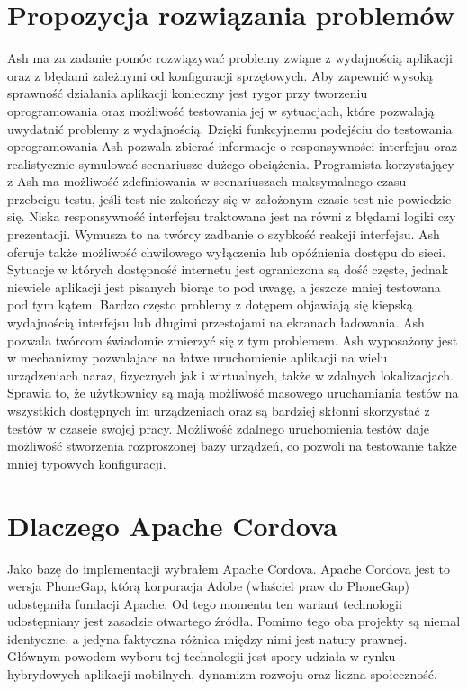 \documentclass[brudnopis]{xmgr}
\begin{document}
\section{Propozycja rozwiązania problemów}
Ash ma za zadanie pomóc rozwiązywać problemy zwiąne z wydajnością aplikacji oraz z
błędami zależnymi od konfiguracji sprzętowych. Aby
zapewnić wysoką sprawność działania aplikacji konieczny jest rygor przy tworzeniu
oprogramowania oraz możliwość testowania jej w sytuacjach, które pozwalają
uwydatnić problemy z wydajnością. Dzięki funkcyjnemu podejściu do testowania
oprogramowania Ash pozwala zbierać informacje o responsywności interfejsu
oraz realistycznie symulować scenariusze dużego obciążenia. Programista
korzystający z Ash ma możliwość zdefiniowania w scenariuszach maksymalnego
czasu przebeigu testu, jeśli test nie zakończy się w założonym czasie test nie
powiedzie się. Niska responsywność interfejsu traktowana jest na równi z błędami
logiki czy prezentacji. Wymusza to na twórcy zadbanie o szybkość reakcji interfejsu.
Ash oferuje także możliwość chwilowego wyłączenia lub opóźnienia dostępu do
sieci. Sytuacje w których dostępność internetu jest ograniczona są dość częste,
jednak niewiele aplikacji jest pisanych biorąc to pod uwagę, a jeszcze mniej 
testowana pod tym kątem. Bardzo często problemy z dotępem objawiają się kiepską
wydajnością interfejsu lub długimi przestojami na ekranach ładowania. Ash pozwala
twórcom świadomie zmierzyć się z tym problemem. Ash wyposażony jest w
mechanizmy pozwalajace na łatwe uruchomienie aplikacji na wielu urządzeniach
naraz, fizycznych jak i wirtualnych, także w zdalnych lokalizacjach. Sprawia to, że
użytkownicy są mają możliwość masowego uruchamiania testów na wszystkich
dostępnych im urządzeniach oraz są bardziej skłonni skorzystać z testów w czaseie
swojej pracy. Możliwość zdalnego uruchomienia testów daje możliwość stworzenia
rozproszonej bazy urządzeń, co pozwoli na testowanie także mniej typowych
konfiguracji.

\section{Dlaczego Apache Cordova}
Jako bazę do implementacji wybrałem Apache Cordova. Apache Cordova jest to
wersja PhoneGap, którą korporacja Adobe (właściel praw do PhoneGap) udostępniła
fundacji Apache. Od tego momentu ten wariant technologii udostępniany jest
zasadzie otwartego źródła. Pomimo tego oba projekty są niemal identyczne, a jedyna faktyczna różnica między nimi jest natury prawnej. Głównym powodem
wyboru tej technologii jest spory udziała w rynku hybrydowych aplikacji mobilnych,
dynamizm rozwoju oraz liczna społeczność.
\end{document}
